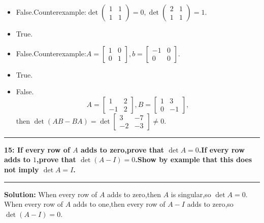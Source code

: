 \documentclass[11pt]{article}
\newcommand\question[2]{\vspace{.25in}\hrule\textbf{#1: #2}\vspace{.5em}\hrule\vspace{.10in}}
\newcommand\solution{\vspace{.10in}\textbf{Solution: }}
\begin{document}
\begin{itemize}
\item False.Counterexample:$
\det  \begin{pmatrix}
    1&1\\
1&1
  \end{pmatrix}=0,
\det  \begin{pmatrix}
    2&1\\
1&1
  \end{pmatrix}=1.
$
\item True.
\item False.Counterexample:$A=
  \begin{bmatrix}
    1&0\\
    0&1
  \end{bmatrix},b=
  \begin{bmatrix}
    -1&0\\
     0&0
  \end{bmatrix}.
$
\item True.
\item False.$$ A=
  \begin{bmatrix}
    1&2\\
    -1&2
  \end{bmatrix},B=
  \begin{bmatrix}
    1&3\\
0&-1
  \end{bmatrix},
$$then $\det (AB-BA)=\det
\begin{bmatrix}
  3&-7\\
-2&-3
\end{bmatrix}\neq 0.
$
\end{itemize}
\question{15}{If every row of $A$ adds to zero,prove that $\det
  A=0$.If every row adds to $1$,prove that $\det (A-I)=0$.Show by
  example that this does not imply $\det A=I$.}
\solution When every row of $A$ adds to zero,then $A$ is singular,so
$\det A=0$.\\
When every row of $A$ adds to one,then every row of $A-I$ adds to
zero,so $\det (A-I)=0$.\\
\end{document}
